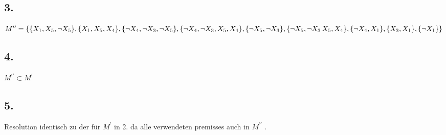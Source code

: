 \subsection*{3.}

$M'' = \{\\
\{X_1, X_5, \neg X_5\}, \{X_1, X_5, X_4\},\\
\{\neg X_4, \neg X_3, \neg X_5\}, \{\neg X_4, \neg X_3, X_5, X_4\},\\
\{\neg X_5, \neg X_3\}, \{\neg X_5, \neg X_3\, X_5, X_4\}, \\
\{\neg X_4, X_1\}, \{X_3,X_1\} , \{\neg X_1\}\\
\}$

\subsection*{4.}

$M^{\prime\prime} \subset M^{\prime}$

\subsection*{5.}

Resolution identisch zu der für $M^\prime$ in 2. da alle verwendeten premisses auch in $M^{\prime\prime}$ .
